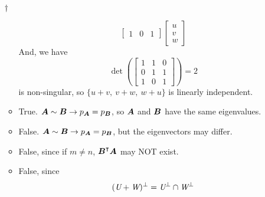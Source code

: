 \documentclass[a4paper,12pt]{article}
\begin{document}
\begin{enumerate}
\begin{answer}{$\dag$}
\begin{itemize}
\begin{equation}
\begin{bmatrix}
                    1 & 0 & 1
                \end{bmatrix} \begin{bmatrix}
                    u \\
                    v \\
                    w
                \end{bmatrix}
            \end{equation} And, we have \begin{equation}
                \det\left(\begin{bmatrix}
                    1 & 1 & 0 \\
                    0 & 1 & 1 \\
                    1 & 0 & 1
                \end{bmatrix}\right) = 2
            \end{equation} is non-singular, so $\{u + v, \ v + w, \ w + u\}$ is linearly independent.
            \item True. $\boldsymbol{A} \sim \boldsymbol{B} \rightarrow p_{\boldsymbol{A}} = p_{\boldsymbol{B}}$, so $\boldsymbol{A}$ and $\boldsymbol{B}$ have the same eigenvalues.
            \item False. $\boldsymbol{A} \sim \boldsymbol{B} \rightarrow p_{\boldsymbol{A}} = p_{\boldsymbol{B}}$, but the eigenvectors may differ.
            \item False, since if $m \neq n$, $\boldsymbol{B}^\intercal\boldsymbol{A}$ may NOT exist.
            \item False, since \begin{equation}
                (\textit{U} + \textit{W})^{\perp} = \textit{U}^{\perp} \cap \textit{W}^{\perp}
            \end{equation}
        \end{itemize}
    \end{answer}
\end{enumerate}

\end{document}
